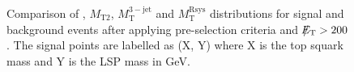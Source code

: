 \begin{figure}[!t]
  \centering
{}
  \caption{Comparison of \met, $M_\mathrm{T2}$, $M_\mathrm{T}^\mathrm{3-jet}$ and $M_\mathrm{T}^\mathrm{Rsys}$ distributions for signal and background events after applying pre-selection criteria and $\slash\mkern-12mu{E}_{\text{T}} > 200$\gev. The signal points are labelled as (X, Y) where X is the top squark mass and Y is the LSP mass in GeV.}
  \label{fig:stop_ref_plots}
\end{figure} 
